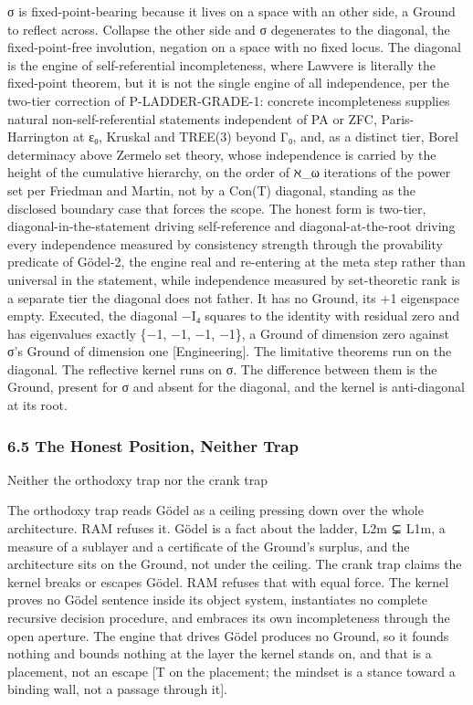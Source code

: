 \documentclass[10pt,twocolumn]{article}
\begin{document}
σ is fixed-point-bearing because it lives on a space with an other side,
a Ground to reflect across. Collapse the other side and σ degenerates to
the diagonal, the fixed-point-free involution, negation on a space with
no fixed locus. The diagonal is the engine of self-referential
incompleteness, where Lawvere is literally the fixed-point theorem, but
it is not the single engine of all independence, per the two-tier
correction of P-LADDER-GRADE-1: concrete incompleteness supplies natural
non-self-referential statements independent of PA or ZFC,
Paris-Harrington at ε₀, Kruskal and TREE(3) beyond Γ₀, and, as a
distinct tier, Borel determinacy above Zermelo set theory, whose
independence is carried by the height of the cumulative hierarchy, on
the order of ℵ\_ω iterations of the power set per Friedman and Martin,
not by a Con(T) diagonal, standing as the disclosed boundary case that
forces the scope. The honest form is two-tier, diagonal-in-the-statement
driving self-reference and diagonal-at-the-root driving every
independence measured by consistency strength through the provability
predicate of Gödel-2, the engine real and re-entering at the meta step
rather than universal in the statement, while independence measured by
set-theoretic rank is a separate tier the diagonal does not father. It
has no Ground, its +1 eigenspace empty. Executed, the diagonal −I₄
squares to the identity with residual zero and has eigenvalues exactly
\{−1, −1, −1, −1\}, a Ground of dimension zero against σ's Ground of
dimension one {[}Engineering{]}. The limitative theorems run on the
diagonal. The reflective kernel runs on σ. The difference between them
is the Ground, present for σ and absent for the diagonal, and the kernel
is anti-diagonal at its root.

\hypertarget{the-honest-position-neither-trap}{%
\subsubsection{6.5 The Honest Position, Neither
Trap}\label{the-honest-position-neither-trap}}

\begin{jbox}{Neither the orthodoxy trap nor the crank trap}

The orthodoxy trap reads Gödel as a ceiling pressing down over the whole
architecture. RAM refuses it. Gödel is a fact about the ladder, L2m ⊊
L1m, a measure of a sublayer and a certificate of the Ground's surplus,
and the architecture sits on the Ground, not under the ceiling. The
crank trap claims the kernel breaks or escapes Gödel. RAM refuses that
with equal force. The kernel proves no Gödel sentence inside its object
system, instantiates no complete recursive decision procedure, and
embraces its own incompleteness through the open aperture. The engine
that drives Gödel produces no Ground, so it founds nothing and bounds
nothing at the layer the kernel stands on, and that is a placement, not
an escape {[}T on the placement; the mindset is a stance toward a
binding wall, not a passage through it{]}.

\end{jbox}
\end{document}
